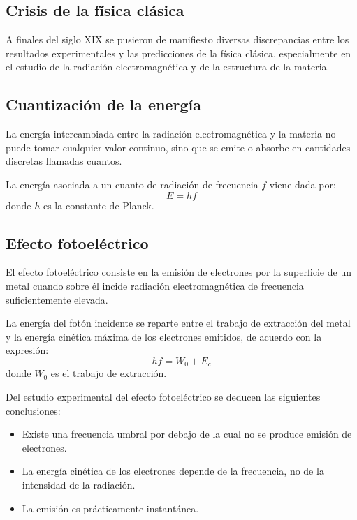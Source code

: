 \documentclass[10pt]{article}
\begin{document}
\subsection{Crisis de la física clásica}

\begin{remark}
  A finales del siglo XIX se pusieron de manifiesto diversas discrepancias entre los resultados experimentales y las predicciones de la física clásica, especialmente en el estudio de la radiación electromagnética y de la estructura de la materia.
\end{remark}

\subsection{Cuantización de la energía}

\begin{definition}
  La energía intercambiada entre la radiación electromagnética y la materia no puede tomar cualquier valor continuo, sino que se emite o absorbe en cantidades discretas llamadas cuantos.
\end{definition}

\begin{theorem}
  La energía asociada a un cuanto de radiación de frecuencia $f$ viene dada por:
  \[ E = hf \]
  donde $h$ es la constante de Planck.
\end{theorem}

\subsection{Efecto fotoeléctrico}

\begin{definition}
  El efecto fotoeléctrico consiste en la emisión de electrones por la superficie de un metal cuando sobre él incide radiación electromagnética de frecuencia suficientemente elevada.
\end{definition}

\begin{theorem}
  La energía del fotón incidente se reparte entre el trabajo de extracción del metal y la energía cinética máxima de los electrones emitidos, de acuerdo con la expresión:
  \[ hf = W_0 + E_c \]
  donde $W_0$ es el trabajo de extracción.
\end{theorem}

\begin{remark}
  Del estudio experimental del efecto fotoeléctrico se deducen las siguientes conclusiones:
  \begin{itemize}
    \item Existe una frecuencia umbral por debajo de la cual no se produce emisión de electrones.
    \item La energía cinética de los electrones depende de la frecuencia, no de la intensidad de la radiación.
    \item La emisión es prácticamente instantánea.
  \end{itemize}
\end{remark}
\end{document}
